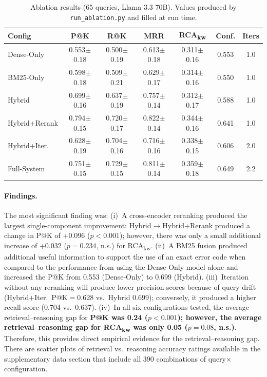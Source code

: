 \documentclass[11pt,a4paper]{article}
\begin{document}
\begin{table}[h]
\centering
\small
\caption{Ablation results (65 queries, Llama 3.3 70B).
Values produced by \texttt{run\_ablation.py} and filled at run time.}
\label{tab:ablation}
\begin{tabular}{lcccccc}
\toprule
\textbf{Config} & \textbf{P@K} & \textbf{R@K} & \textbf{MRR} & \textbf{RCA\textsubscript{kw}} & \textbf{Conf.} & \textbf{Iters} \\
\midrule
Dense-Only           & 0.553$\pm$0.18 & 0.500$\pm$0.19 & 0.613$\pm$0.18 & 0.311$\pm$0.16 & 0.553 & 1.0 \\
BM25-Only            & 0.598$\pm$0.18 & 0.509$\pm$0.21 & 0.629$\pm$0.17 & 0.314$\pm$0.16 & 0.550 & 1.0 \\
Hybrid               & 0.699$\pm$0.16 & 0.637$\pm$0.19 & 0.757$\pm$0.14 & 0.312$\pm$0.17 & 0.588 & 1.0 \\
Hybrid+Rerank        & 0.794$\pm$0.15 & 0.720$\pm$0.17 & 0.822$\pm$0.14 & 0.344$\pm$0.16 & 0.641 & 1.0 \\
Hybrid+Iter.         & 0.628$\pm$0.19 & 0.704$\pm$0.16 & 0.716$\pm$0.16 & 0.338$\pm$0.15 & 0.606 & 2.0 \\
Full-System          & 0.751$\pm$0.15 & 0.729$\pm$0.15 & 0.811$\pm$0.14 & 0.359$\pm$0.18 & 0.649 & 2.2 \\
\bottomrule
\end{tabular}
\end{table}

\paragraph{Findings.}
The most significant finding was:
(i)~A cross-encoder reranking produced the largest single-component
improvement: Hybrid$\to$Hybrid+Rerank produced a change in P@K of
+0.096 ($p{<}0.001$); however, there was only a small additional
increase of +0.032 ($p{=}0.234$, n.s.) for
RCA\textsubscript{kw}.
(ii)~A BM25 fusion produced additional useful information to support
the use of an exact error code when compared to the performance from
using the Dense-Only model alone and increased the P@K from 0.553
(Dense-Only) to 0.699 (Hybrid).
(iii)~Iteration without any reranking will produce lower precision
scores because of query drift (Hybrid+Iter.\
P@K$=$0.628 vs.\ Hybrid 0.699); conversely, it produced a higher
recall score (0.704 vs.\ 0.637).
(iv)~In all six configurations tested, the average
retrieval--reasoning gap for \textbf{P@K was 0.24 ($p{<}0.001$);
however, the average retrieval--reasoning gap for
RCA\textsubscript{kw} was only 0.05 ($p{=}0.08$, n.s.)}.
Therefore, this provides direct empirical evidence for the
retrieval--reasoning gap.
There are scatter plots of retrieval vs.\ reasoning accuracy
ratings available in the supplementary data section that include all
390 combinations of query$\times$configuration.
\end{document}
